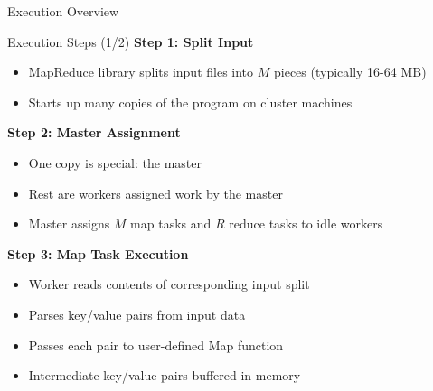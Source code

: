 \documentclass[aspectratio=169]{beamer}
\begin{document}
\begin{frame}[fragile]{Execution Overview}
\begin{center}
\end{center}
\end{frame}

\begin{frame}{Execution Steps (1/2)}
\textbf{Step 1: Split Input}
\begin{itemize}
    \item MapReduce library splits input files into $M$ pieces (typically 16-64 MB)
    \item Starts up many copies of the program on cluster machines
\end{itemize}

\vspace{0.2cm}

\textbf{Step 2: Master Assignment}
\begin{itemize}
    \item One copy is special: the \alert{master}
    \item Rest are workers assigned work by the master
    \item Master assigns $M$ map tasks and $R$ reduce tasks to idle workers
\end{itemize}

\vspace{0.2cm}

\textbf{Step 3: Map Task Execution}
\begin{itemize}
    \item Worker reads contents of corresponding input split
    \item Parses key/value pairs from input data
    \item Passes each pair to user-defined Map function
    \item Intermediate key/value pairs buffered in memory
\end{itemize}
\end{frame}
\end{document}
